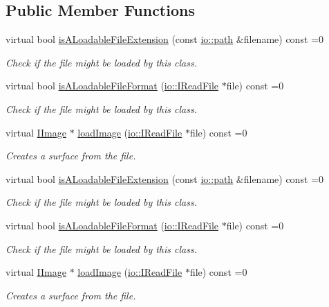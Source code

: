 \subsection*{Public Member Functions}
\begin{DoxyCompactItemize}
\item 
virtual bool \hyperlink{classirr_1_1video_1_1IImageLoader_a74f191446424017b8a71fea274bd0f0a}{is\+A\+Loadable\+File\+Extension} (const \hyperlink{namespaceirr_1_1io_a6468281622ce3a1c46b72e19f32dded5}{io\+::path} \&filename) const =0
\begin{DoxyCompactList}\small\item\em Check if the file might be loaded by this class. \end{DoxyCompactList}\item 
virtual bool \hyperlink{classirr_1_1video_1_1IImageLoader_aeb87ae825dfdb747e826b1e001a5f5cc}{is\+A\+Loadable\+File\+Format} (\hyperlink{classirr_1_1io_1_1IReadFile}{io\+::\+I\+Read\+File} $\ast$file) const =0
\begin{DoxyCompactList}\small\item\em Check if the file might be loaded by this class. \end{DoxyCompactList}\item 
virtual \hyperlink{classirr_1_1video_1_1IImage}{I\+Image} $\ast$ \hyperlink{classirr_1_1video_1_1IImageLoader_ac3cafd8396e2f6e762f91604bcacf5d3}{load\+Image} (\hyperlink{classirr_1_1io_1_1IReadFile}{io\+::\+I\+Read\+File} $\ast$file) const =0
\begin{DoxyCompactList}\small\item\em Creates a surface from the file. \end{DoxyCompactList}\item 
virtual bool \hyperlink{classirr_1_1video_1_1IImageLoader_a74f191446424017b8a71fea274bd0f0a}{is\+A\+Loadable\+File\+Extension} (const \hyperlink{namespaceirr_1_1io_a6468281622ce3a1c46b72e19f32dded5}{io\+::path} \&filename) const =0
\begin{DoxyCompactList}\small\item\em Check if the file might be loaded by this class. \end{DoxyCompactList}\item 
virtual bool \hyperlink{classirr_1_1video_1_1IImageLoader_aeb87ae825dfdb747e826b1e001a5f5cc}{is\+A\+Loadable\+File\+Format} (\hyperlink{classirr_1_1io_1_1IReadFile}{io\+::\+I\+Read\+File} $\ast$file) const =0
\begin{DoxyCompactList}\small\item\em Check if the file might be loaded by this class. \end{DoxyCompactList}\item 
virtual \hyperlink{classirr_1_1video_1_1IImage}{I\+Image} $\ast$ \hyperlink{classirr_1_1video_1_1IImageLoader_ac3cafd8396e2f6e762f91604bcacf5d3}{load\+Image} (\hyperlink{classirr_1_1io_1_1IReadFile}{io\+::\+I\+Read\+File} $\ast$file) const =0
\begin{DoxyCompactList}\small\item\em Creates a surface from the file. \end{DoxyCompactList}\end{DoxyCompactItemize}
